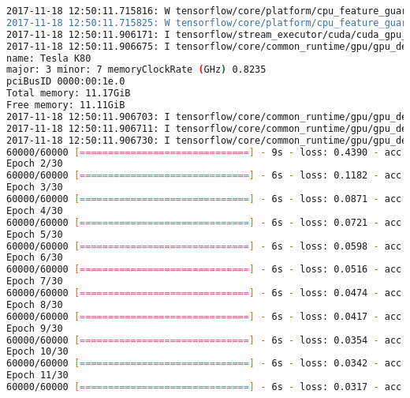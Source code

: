 \begin{lstlisting}[language=bash]
2017-11-18 12:50:11.715816: W tensorflow/core/platform/cpu_feature_guard.cc:45] The TensorFlow library wasn't compiled to use AVX2 instructions, but these are available on your machine and could speed up CPU computations.
2017-11-18 12:50:11.715825: W tensorflow/core/platform/cpu_feature_guard.cc:45] The TensorFlow library wasn't compiled to use FMA instructions, but these are available on your machine and could speed up CPU computations.
2017-11-18 12:50:11.906171: I tensorflow/stream_executor/cuda/cuda_gpu_executor.cc:893] successful NUMA node read from SysFS had negative value (-1), but there must be at least one NUMA node, so returning NUMA node zero
2017-11-18 12:50:11.906675: I tensorflow/core/common_runtime/gpu/gpu_device.cc:955] Found device 0 with properties:
name: Tesla K80
major: 3 minor: 7 memoryClockRate (GHz) 0.8235
pciBusID 0000:00:1e.0
Total memory: 11.17GiB
Free memory: 11.11GiB
2017-11-18 12:50:11.906703: I tensorflow/core/common_runtime/gpu/gpu_device.cc:976] DMA: 0
2017-11-18 12:50:11.906711: I tensorflow/core/common_runtime/gpu/gpu_device.cc:986] 0:   Y
2017-11-18 12:50:11.906730: I tensorflow/core/common_runtime/gpu/gpu_device.cc:1045] Creating TensorFlow device (/gpu:0) -> (device: 0, name: Tesla K80, pci bus id: 0000:00:1e.0)
60000/60000 [==============================] - 9s - loss: 0.4390 - acc: 0.8630 - val_loss: 0.0676 - val_acc: 0.9786
Epoch 2/30
60000/60000 [==============================] - 6s - loss: 0.1182 - acc: 0.9691 - val_loss: 0.0462 - val_acc: 0.9854
Epoch 3/30
60000/60000 [==============================] - 6s - loss: 0.0871 - acc: 0.9784 - val_loss: 0.0334 - val_acc: 0.9896
Epoch 4/30
60000/60000 [==============================] - 6s - loss: 0.0721 - acc: 0.9819 - val_loss: 0.0324 - val_acc: 0.9899
Epoch 5/30
60000/60000 [==============================] - 6s - loss: 0.0598 - acc: 0.9850 - val_loss: 0.0290 - val_acc: 0.9916
Epoch 6/30
60000/60000 [==============================] - 6s - loss: 0.0516 - acc: 0.9868 - val_loss: 0.0281 - val_acc: 0.9914
Epoch 7/30
60000/60000 [==============================] - 6s - loss: 0.0474 - acc: 0.9878 - val_loss: 0.0267 - val_acc: 0.9922
Epoch 8/30
60000/60000 [==============================] - 6s - loss: 0.0417 - acc: 0.9896 - val_loss: 0.0283 - val_acc: 0.9926
Epoch 9/30
60000/60000 [==============================] - 6s - loss: 0.0354 - acc: 0.9902 - val_loss: 0.0263 - val_acc: 0.9927
Epoch 10/30
60000/60000 [==============================] - 6s - loss: 0.0342 - acc: 0.9910 - val_loss: 0.0273 - val_acc: 0.9929
Epoch 11/30
60000/60000 [==============================] - 6s - loss: 0.0317 - acc: 0.9920 - val_loss: 0.0259 - val_acc: 0.9931

\end{lstlisting}
